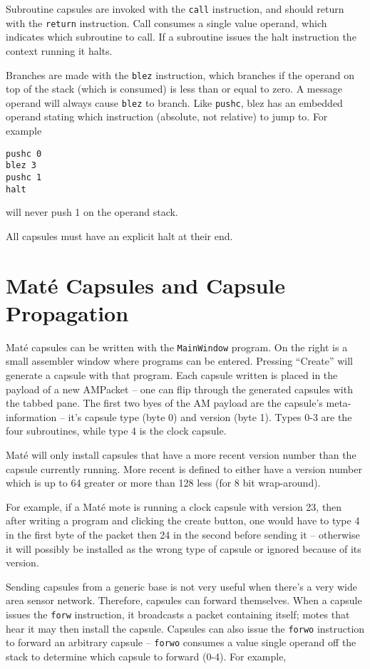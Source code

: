 \documentclass[10pt]{article}
\def\Mate{{Mat\'{e} }}
\begin{document}
Subroutine capsules are invoked with the {\tt call} instruction, and
should return with the {\tt return} instruction. Call consumes a
single value operand, which indicates which subroutine to call. If a
subroutine issues the halt instruction the context running it halts.

Branches are made with the {\tt blez} instruction, which branches if
the operand on top of the stack (which is consumed) is less than or
equal to zero. A message operand will always cause {\tt blez} to
branch. Like {\tt pushc}, blez has an embedded operand stating which
instruction (absolute, not relative) to jump to. For example

\begin{verbatim}
pushc 0
blez 3
pushc 1
halt
\end{verbatim}

will never push 1 on the operand stack.

All capsules must have an explicit halt at their end.

\section*{\Mate Capsules and Capsule Propagation}

\Mate capsules can be written with the {\tt MainWindow} program. On
the right is a small assembler window where programs can be
entered. Pressing ``Create'' will generate a capsule with that
program. Each capsule written is placed in the payload of a new
AMPacket -- one can flip through the generated capsules with the
tabbed pane. The first two byes of the AM payload are the capsule's
meta-information -- it's capsule type (byte 0) and version (byte
1). Types 0-3 are the four subroutines, while type 4 is the clock
capsule.

\Mate will only install capsules that have a more recent version
number than the capsule currently running. More recent is defined to
either have a version number which is up to 64 greater or more than
128 less (for 8 bit wrap-around).

For example, if a \Mate mote is running a clock capsule with version
23, then after writing a program and clicking the create button, one
would have to type 4 in the first byte of the packet then 24 in the
second before sending it -- otherwise it will possibly be installed as
the wrong type of capsule or ignored because of its version.

Sending capsules from a generic base is not very useful when there's a
very wide area sensor network. Therefore, capsules can forward
themselves. When a capsule issues the {\tt forw} instruction, it
broadcasts a packet containing itself; motes that hear it may then
install the capsule. Capsules can also issue the {\tt forwo}
instruction to forward an arbitrary capsule -- {\tt forwo} consumes a
value single operand off the stack to determine which capsule to
forward (0-4). For example,
\end{document}
